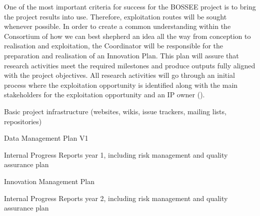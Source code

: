 \begin{workpackage}
\begin{tasklist}
\begin{task}[
  title=Innovation Management,
  id=innovation-management,
  lead=SRL,
  PM=6,
  wphases={0-48},
  partners={SRL,UPSUD,XFEL,QS,SIL,WTT,UIO,EGI,INSERM,CDS,EP}
]
One of the most important criteria for success for the BOSSEE project is to bring the project results into use. Therefore, exploitation routes will be sought whenever possible. In order to create a common understanding within the Consortium of how we can best shepherd an idea all the way from conception to realisation and exploitation, the Coordinator will be responsible for the preparation and realisation of an Innovation Plan. This plan will assure that research activities meet the required milestones and produce outputs fully aligned with the project objectives. All research activities will go through an initial process where the exploitation opportunity is identified along with the main stakeholders for the exploitation opportunity and an IP owner
().
\end{task}

\end{tasklist}


\begin{wpdelivs}

\begin{wpdeliv}[due=1,miles=startup,id=infrastructure,dissem=PU,nature=DEC,lead=SRL]
  {Basic project infrastructure (websites, wikis, issue trackers, mailing lists, repositories)}
\end{wpdeliv}

\begin{wpdeliv}[due=6,miles=startup,id=data-management-plan,dissem=PU,nature=R,lead=SRL]
  {Data Management Plan V1}
\end{wpdeliv}

\begin{wpdeliv}[due=12,miles=startup,id=progress-report-1,dissem=CO,nature=R,lead=SRL]
  {Internal Progress Reports year 1, including risk management and quality assurance plan}
\end{wpdeliv}

\begin{wpdeliv}[due=18,miles=startup,id=innovation-management-plan,dissem=CO,nature=R,lead=SRL]
  {Innovation Management Plan}
\end{wpdeliv}

\begin{wpdeliv}[due=36,miles=startup,id=progress-report-2,dissem=CO,nature=R,lead=SRL]
  {Internal Progress Reports year 2, including risk management and quality assurance plan}
\end{wpdeliv}

\end{wpdelivs}
\end{workpackage}

